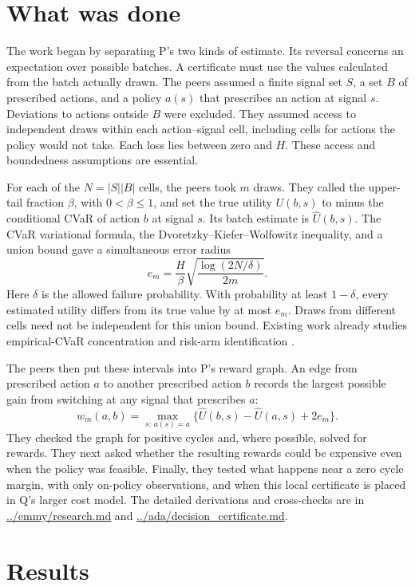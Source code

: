 \documentclass{article}
\begin{document}
\section{What was done}

The work began by separating P's two kinds of estimate. Its reversal concerns an expectation over
possible batches. A certificate must use the values calculated from the batch actually drawn. The
peers assumed a finite signal set \(S\), a set \(B\) of prescribed actions, and a policy \(a(s)\)
that prescribes an action at signal \(s\). Deviations to actions outside \(B\) were excluded. They
assumed access to independent draws within each action--signal cell, including cells for actions the
policy would not take. Each loss lies between zero and \(H\). These access and boundedness
assumptions are essential.

For each of the \(N=|S||B|\) cells, the peers took \(m\) draws. They called the upper-tail fraction
\(\beta\), with \(0<\beta\leq1\), and set the true utility \(U(b,s)\) to minus the conditional CVaR
of action \(b\) at signal \(s\). Its batch estimate is \(\widehat U(b,s)\). The CVaR variational
formula, the Dvoretzky--Kiefer--Wolfowitz inequality, and a union bound gave a simultaneous error
radius
\[
e_m=\frac{H}{\beta}
\sqrt{\frac{\log(2N/\delta)}{2m}}.
\]
Here \(\delta\) is the allowed failure probability. With probability at least \(1-\delta\), every
estimated utility differs from its true value by at most \(e_m\). Draws from different cells need
not be independent for this union bound. Existing work already studies empirical-CVaR concentration
and risk-arm identification \cite{cvarfixed,cvarother,cvarneurips}.

The peers then put these intervals into P's reward graph. An edge from prescribed action \(a\) to
another prescribed action \(b\) records the largest possible gain from switching at any signal that
prescribes \(a\):
\[
w_m(a,b)=
\max_{s:\,a(s)=a}
\bigl\{\widehat U(b,s)-\widehat U(a,s)+2e_m\bigr\}.
\]
They checked the graph for positive cycles and, where possible, solved for rewards. They next asked
whether the resulting rewards could be expensive even when the policy was feasible. Finally, they
tested what happens near a zero cycle margin, with only on-policy observations, and when this local
certificate is placed in Q's larger cost model. The detailed derivations and cross-checks are in
\url{../emmy/research.md} and \url{../ada/decision_certificate.md}.

\section{Results}
\end{document}
